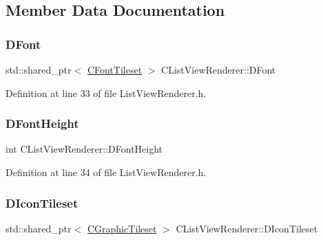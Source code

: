 \subsection{Member Data Documentation}
\hypertarget{classCListViewRenderer_a1fc512e6dd37dba02b6e6fa5800ef222}{}\label{classCListViewRenderer_a1fc512e6dd37dba02b6e6fa5800ef222} 
\subsubsection{\texorpdfstring{D\+Font}{DFont}}
{\footnotesize\ttfamily std\+::shared\+\_\+ptr$<$ \hyperlink{classCFontTileset}{C\+Font\+Tileset} $>$ C\+List\+View\+Renderer\+::\+D\+Font\hspace{0.3cm}{\ttfamily [protected]}}



Definition at line 33 of file List\+View\+Renderer.\+h.

\hypertarget{classCListViewRenderer_a4d5e792e525ca2df01f0300bfe1248af}{}\label{classCListViewRenderer_a4d5e792e525ca2df01f0300bfe1248af} 
\subsubsection{\texorpdfstring{D\+Font\+Height}{DFontHeight}}
{\footnotesize\ttfamily int C\+List\+View\+Renderer\+::\+D\+Font\+Height\hspace{0.3cm}{\ttfamily [protected]}}



Definition at line 34 of file List\+View\+Renderer.\+h.

\hypertarget{classCListViewRenderer_af6e36f127e551dd54c01f8df0fadeb9c}{}\label{classCListViewRenderer_af6e36f127e551dd54c01f8df0fadeb9c} 
\subsubsection{\texorpdfstring{D\+Icon\+Tileset}{DIconTileset}}
{\footnotesize\ttfamily std\+::shared\+\_\+ptr$<$ \hyperlink{classCGraphicTileset}{C\+Graphic\+Tileset} $>$ C\+List\+View\+Renderer\+::\+D\+Icon\+Tileset\hspace{0.3cm}{\ttfamily [protected]}}



